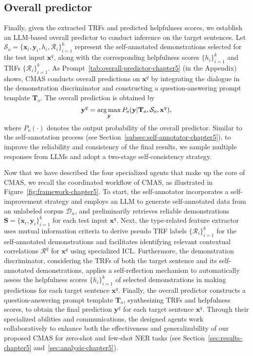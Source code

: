 \subsection{Overall predictor}
\label{subsec:predictor}
Finally, given the extracted \acp{TRF} and predicted helpfulness scores, we establish an \ac{LLM}-based overall predictor to conduct inference on the target sentences. Let $\mathcal{S}_{o}=\{\mathbf{x}_i, \mathbf{y}_i, h_{i}, \mathcal{R}_{i}\}_{i=1}^k$ represent the self-annotated demonstrations selected for the test input $\mathbf{x}^q$, along with the corresponding helpfulness scores $\{h_i\}_{i=1}^k$ and \acp{TRF} $\{\mathcal{R}_i\}_{i=1}^k$. As Prompt~\ref{tab:overall-predictor-chapter5} (in the Appendix) shows, \ac{CMAS} conducts overall predictions on $\mathbf{x}^q$ by integrating the dialogue in the demonstration discriminator and constructing a question-answering prompt template $\mathbf{T}_{o}$. The overall prediction is obtained by 
%
\begin{equation}
\setlength{\abovedisplayskip}{6pt}
\setlength{\belowdisplayskip}{6pt}
\mathbf{y}^q = \mathop{\arg\max}_{\mathbf{y}} P_{o}(\mathbf{y}|\mathbf{T}_{o}, \mathcal{S}_{o}, \mathbf{x}^q),
\end{equation}
%
where $P_{o}(\cdot)$ denotes the output probability of the overall predictor.
Similar to the self-annotation process (see Section~\ref{subsec:self-annotator-chapter5}), to improve the reliability and consistency of the final results, we sample multiple responses from \acp{LLM} and adopt a two-stage self-consistency strategy.

Now that we have described the four specialized agents that make up the core of \ac{CMAS}, we recall the coordinated workflow of \ac{CMAS}, as illustrated in Figure~\ref{fig:framework-chapter5}. To start, the self-annotator incorporates a self-improvement strategy and employs an \ac{LLM} to generate self-annotated data from an unlabeled corpus $\mathcal{D}_{u}$, and preliminarily retrieves reliable demonstrations $\mathbf{S} = \{\mathbf{x}_{i}, \mathbf{y}_{i}\}_{i=1}^{k}$ for each test input $\mathbf{x}^{q}$.
Next, the type-related feature extractor uses mutual information criteria to derive pseudo \ac{TRF} labels $\{\mathcal{R}_{i}\}_{i=1}^{k}$ for the self-annotated demonstrations and facilitates identifying relevant contextual correlations $\mathcal{R}^{q}$ for $\mathbf{x}^{q}$ using specialized \ac{ICL}.
Furthermore, the demonstration discriminator, considering the \acp{TRF} of both the target sentence and its self-annotated demonstrations, applies a self-reflection mechanism to automatically assess the helpfulness scores $\{h_i\}^{k}_{i=1}$ of selected demonstrations in making predictions for each target sentence $\mathbf{x}^{q}$.
Finally, the overall predictor constructs a question-answering prompt template $\mathbf{T}_{o}$, synthesizing \acp{TRF} and helpfulness scores, to obtain the final prediction $\mathbf{y}^{q}$ for each target sentence $\mathbf{x}^{q}$.
Through their specialized abilities and communications, the designed agents work collaboratively to enhance both the effectiveness and generalizability of our proposed \ac{CMAS} for zero-shot and few-shot NER tasks (see Section~\ref{sec:results-chapter5} and~\ref{sec:analysis-chapter5}).

